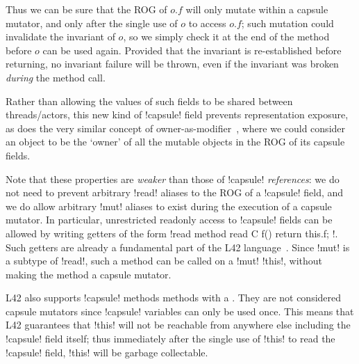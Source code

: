 Thus we can be sure that the ROG of $o.f$ will only mutate within a capsule mutator, and only after the single use of $o$ to access $o.f$; such mutation could invalidate the invariant of $o$, so we simply check it at the end of the method before $o$ can be used again. Provided that the invariant is re-established before returning, no invariant failure will be thrown, even if the invariant was broken \emph{during} the method call.

 
Rather than allowing the values of such fields to be shared between threads/actors, this new kind of \Q!capsule! field prevents representation exposure, as does the very similar concept of owner-as-modifier~\cite{Dietl05universes:lightweight,10.1007/978-3-540-92188-2_4}, where we could consider an object to be the `owner' of all the mutable objects in the ROG of its capsule fields.

Note that these properties are \emph{weaker} than those of \Q!capsule! \emph{references}: we do not need to prevent arbitrary \Q!read! aliases to the ROG of a \Q!capsule! field, and we do allow arbitrary \Q!mut! aliases  to exist during the execution of a capsule mutator. In particular, unrestricted readonly access to \Q!capsule! fields can be allowed by writing getters of the form \Q!read method read C f() { return this.f; }!. Such getters are already a fundamental part of the L42 language~\cite{DBLP:journals/programming/AroraSO19}. Since \Q!mut! is a subtype of \Q!read!, such a method can be called on a \Q!mut! \Q!this!, without making the method a capsule mutator.

L42 also supports \Q!capsule! methods\IODel{;}\IO{:} methods with a \Q@capsule@ \Q@this@. They are not considered capsule mutators since \Q!capsule! variables can only be used once. This means that L42 guarantees that \Q!this! will not be reachable from anywhere else including the \Q!capsule! field itself; thus immediately after the single use of \Q!this! to read the \Q!capsule! field, \Q!this! will be garbage collectable.



